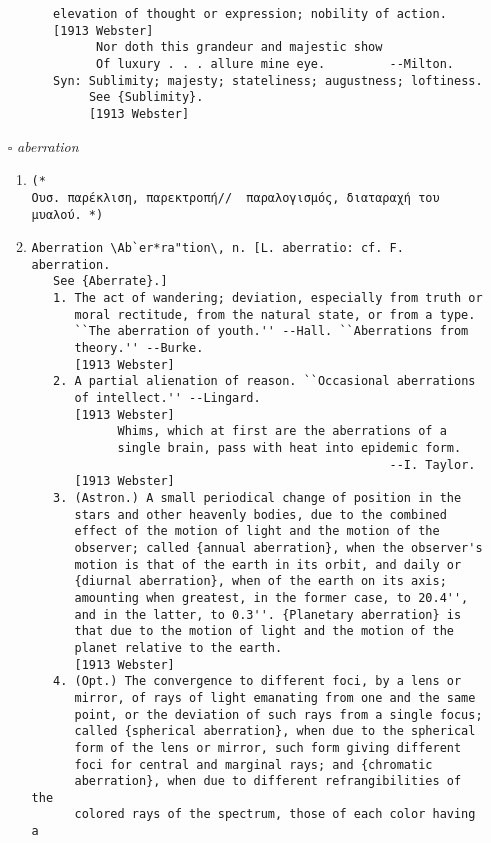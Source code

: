 \documentclass{article}
\begin{document}
\begin{itemize}
\begin{enumerate}
{\begin{lstlisting}
   elevation of thought or expression; nobility of action.
   [1913 Webster]
         Nor doth this grandeur and majestic show
         Of luxury . . . allure mine eye.         --Milton.
   Syn: Sublimity; majesty; stateliness; augustness; loftiness.
        See {Sublimity}.
        [1913 Webster]
\end{lstlisting}}
\end{enumerate}
\item[$\square$] \emph{ aberration }
\begin{enumerate}
\item{
\begin{lstlisting}
(* 
Ουσ. παρέκλιση, παρεκτροπή//  παραλογισμός, διαταραχή του μυαλού. *)
\end{lstlisting}}
\item{
\begin{lstlisting}
Aberration \Ab`er*ra"tion\, n. [L. aberratio: cf. F. aberration.
   See {Aberrate}.]
   1. The act of wandering; deviation, especially from truth or
      moral rectitude, from the natural state, or from a type.
      ``The aberration of youth.'' --Hall. ``Aberrations from
      theory.'' --Burke.
      [1913 Webster]
   2. A partial alienation of reason. ``Occasional aberrations
      of intellect.'' --Lingard.
      [1913 Webster]
            Whims, which at first are the aberrations of a
            single brain, pass with heat into epidemic form.
                                                  --I. Taylor.
      [1913 Webster]
   3. (Astron.) A small periodical change of position in the
      stars and other heavenly bodies, due to the combined
      effect of the motion of light and the motion of the
      observer; called {annual aberration}, when the observer's
      motion is that of the earth in its orbit, and daily or
      {diurnal aberration}, when of the earth on its axis;
      amounting when greatest, in the former case, to 20.4'',
      and in the latter, to 0.3''. {Planetary aberration} is
      that due to the motion of light and the motion of the
      planet relative to the earth.
      [1913 Webster]
   4. (Opt.) The convergence to different foci, by a lens or
      mirror, of rays of light emanating from one and the same
      point, or the deviation of such rays from a single focus;
      called {spherical aberration}, when due to the spherical
      form of the lens or mirror, such form giving different
      foci for central and marginal rays; and {chromatic
      aberration}, when due to different refrangibilities of the
      colored rays of the spectrum, those of each color having a

\end{lstlisting}}
\end{enumerate}
\end{itemize}
\end{document}
